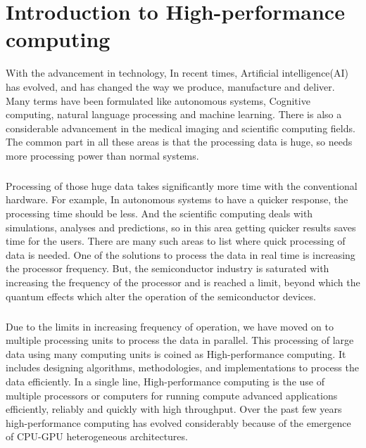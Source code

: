 %
\chapter{Introduction to High-performance computing}
With the advancement in technology, In recent times, Artificial intelligence(AI) has evolved, and  has changed the way we produce, manufacture and deliver. Many terms have been formulated like autonomous systems, Cognitive computing, natural language processing and machine learning. There is also a considerable advancement in the medical imaging and scientific computing fields. The common part in all these areas is that the processing data is huge, so needs more processing power than normal systems.\paragraph*{}Processing of those huge data takes significantly more time with the conventional hardware. For example, In autonomous systems to have a quicker response, the processing time should be less. And the scientific computing deals with simulations, analyses and predictions, so in this area getting quicker results saves time for the users. There are many such areas to list where quick processing of data is needed. One of the solutions to process the data in real time is increasing the processor frequency. But, the semiconductor industry is saturated with increasing the frequency of the processor and is reached a limit, beyond which the quantum effects which alter the operation of the semiconductor devices.\paragraph*{}Due to the limits in increasing frequency of operation, we have moved on to multiple processing units to process the data in parallel. This processing of large data using many computing units is coined as High-performance computing. It includes designing algorithms, methodologies, and implementations to process the data efficiently. In a single line, High-performance computing is the use of multiple processors or computers for running compute advanced applications efficiently, reliably and quickly with high throughput. Over the past few years high-performance computing has evolved considerably because of the emergence of CPU-GPU heterogeneous architectures.
